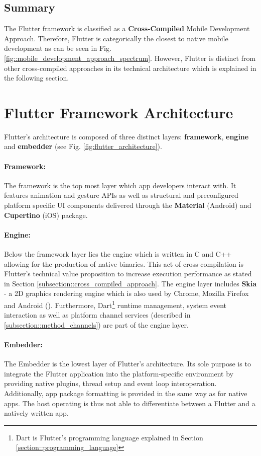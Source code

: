 \subsection{Summary}
The Flutter framework is classified as a \textbf{Cross-Compiled} Mobile Development Approach. Therefore, Flutter is categorically the closest to 
native mobile development as can be seen in Fig. \ref{fig::mobile_development_approach_spectrum}.
However, Flutter is distinct from other cross-compiled approaches in its technical architecture which is explained in the following section.


\section{Flutter Framework Architecture} \label{section::flutter_architecture}
Flutter's architecture is composed of three distinct layers: \textbf{framework}, \textbf{engine} and \textbf{embedder} (see Fig. \ref{fig:flutter_architecture}).
\paragraph*{Framework:}
The framework is the top most layer which app developers interact with. It features animation and gesture APIs as well as structural and preconfigured platform specific UI components delivered through
the \textbf{Material} (Android) and \textbf{Cupertino} (iOS) package.
\paragraph*{Engine:}
Below the framework layer lies the engine which is written in C and C++ allowing for the production of native binaries. 
This act of cross-compilation is Flutter's technical value proposition to increase execution performance as stated in 
Section \ref{subsection::cross_compiled_approach}. The engine layer includes \textbf{Skia} - a 2D graphics rendering engine which is also used by Chrome, Mozilla Firefox and Android (\cite{Skia2021}).
Furthermore, Dart\footnote{Dart is Flutter's programming language explained in Section \ref{section::programming_language}} runtime management, system event interaction as well as platform channel services (described in \ref{subsection::method_channels}) are part of the engine layer.
\paragraph*{Embedder:}
The Embedder is the lowest layer of Flutter's architecture. Its sole purpose is to integrate the Flutter application into the platform-specific environment
by providing native plugins, thread setup and event loop interoperation.
Additionally, app package formatting is provided in the same way as for native apps. 
The host operating is thus not able to differentiate between a Flutter and a natively written app.
